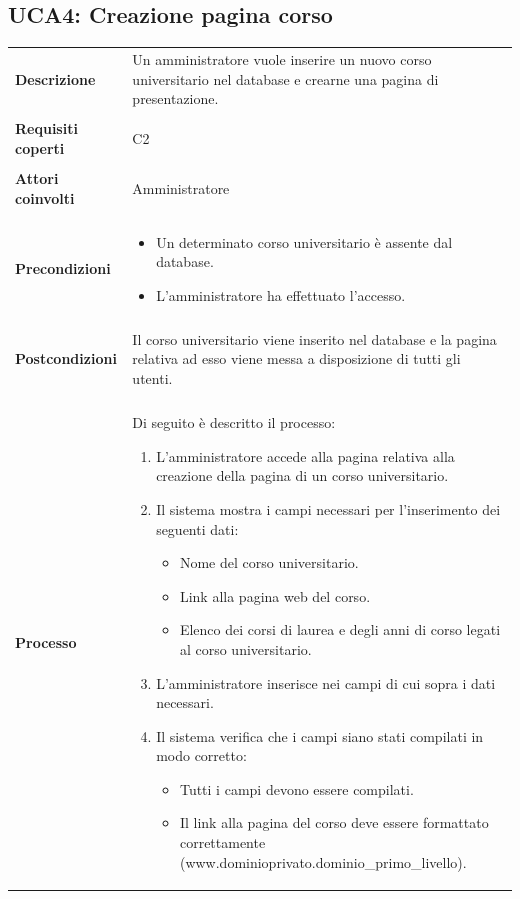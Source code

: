 \documentclass[10pt,a4paper]{report}
\begin{document}
	\subsection{UCA4: Creazione pagina corso}
	\begin{tabular}{lp{}}
		\textbf{Descrizione}&Un amministratore vuole inserire un nuovo corso universitario nel database e crearne una pagina di presentazione.\\
		\\
		\textbf{Requisiti coperti}&C2\\
		\\
		\textbf{Attori coinvolti}&Amministratore\\
		\\
		\textbf{Precondizioni}&\begin{itemize}
			\item Un determinato corso universitario è assente dal database.
			\item L'amministratore ha effettuato l'accesso.
		\end{itemize}\\
		\\
		\textbf{Postcondizioni}&Il corso universitario viene inserito nel database e la pagina relativa ad esso viene messa a disposizione di tutti gli utenti.\\
		\\
		\textbf{Processo}&Di seguito è descritto il processo:
		\begin{enumerate}
			\item L'amministratore accede alla pagina relativa alla creazione della pagina di un corso universitario.
			\item Il sistema mostra i campi necessari per l'inserimento dei seguenti dati:
			\begin{itemize}
				\item Nome del corso universitario.
				\item Link alla pagina web del corso.
				\item Elenco dei corsi di laurea e degli anni di corso legati al corso universitario.
			\end{itemize}
			\item L'amministratore inserisce nei campi di cui sopra i dati necessari.
			\item Il sistema verifica che i campi siano stati compilati in modo corretto:
			\begin{itemize}
				\item Tutti i campi devono essere compilati.
				\item Il link alla pagina del corso deve essere formattato correttamente (www.dominioprivato.dominio\_primo\_livello).

\end{itemize}
\end{enumerate}
\end{tabular}
\end{document}
